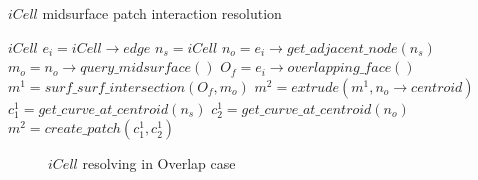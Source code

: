 	\begin{algorithm}[!h]
		\caption{$iCell$ midsurface patch interaction resolution}
		\label{alg_MidsurfiCell}
		\begin{algorithmic}
			\REQUIRE $iCell$
				\STATE $e_i = iCell \rightarrow edge$
				\STATE $n_s = iCell $	
				\STATE $n_o = e_i \rightarrow get\_adjacent\_node(n_s) $			
					\STATE $m_o = n_o \rightarrow query\_midsurface()$
					\STATE $O_f = e_i \rightarrow overlapping\_face()$
					\STATE $m^1 = surf\_surf\_intersection(O_f, m_o)$
					\STATE $m^2 = extrude(m^1, n_o \rightarrow centroid)$
					\STATE $c^1_1= get\_curve\_at\_centroid(n_s)$
					\STATE $c^1_2 = get\_curve\_at\_centroid(n_o)$
					\STATE $m^2 = create\_patch(c^1_1, c^1_2)$
					\ENDIF
			\ENDWHILE
		\end{algorithmic}
	\end{algorithm}
	
	
	\begin{figure}[!h]
	\centering     %
	\quad
	\caption{$iCell$ resolving in  Overlap case} %
	\label{fig_icellsovrelap}
	\end{figure}


